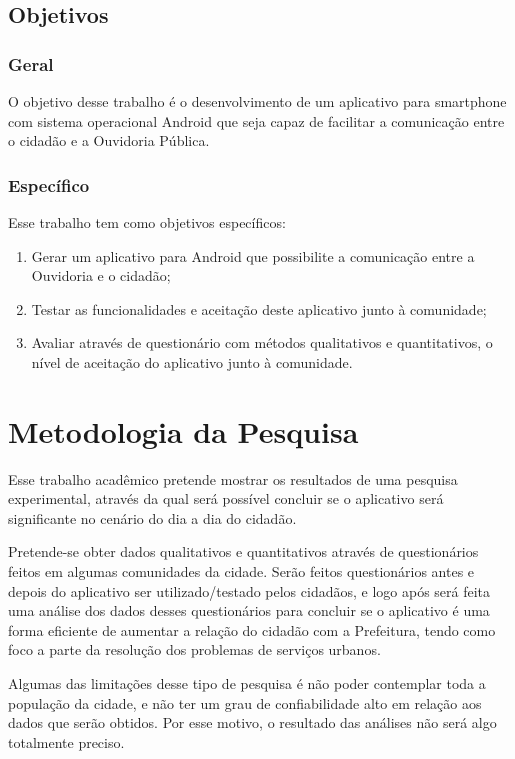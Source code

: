 \documentclass[
	12pt,				%
	openright,			%
	oneside,			%
	a4paper,			%
	english,			%
	french,				%
	spanish,			%
	brazil				%
	]{abntex2}
\begin{document}
\section{Objetivos}

\subsection{Geral}
O objetivo desse trabalho é o desenvolvimento de um aplicativo para smartphone com sistema operacional Android que seja capaz de facilitar a comunicação entre o cidadão e a Ouvidoria Pública.

\subsection{Específico}
Esse trabalho tem como objetivos específicos:
\begin{enumerate}
	\item Gerar um aplicativo para Android que possibilite a comunicação entre a Ouvidoria e o cidadão;
	\item Testar as funcionalidades e aceitação deste aplicativo junto à comunidade;
	\item Avaliar através de questionário com métodos qualitativos e quantitativos, o nível de aceitação do aplicativo junto à comunidade.
\end{enumerate}

\chapter[Metodologia da Pesquisa]{Metodologia da Pesquisa}

Esse trabalho acadêmico pretende mostrar os resultados de uma pesquisa experimental, através da qual será possível concluir se o aplicativo será significante no cenário do dia a  dia do cidadão.

Pretende-se obter dados qualitativos e quantitativos através de questionários feitos em algumas comunidades da cidade. Serão feitos questionários antes e depois do aplicativo ser utilizado/testado pelos cidadãos, e logo após será feita uma análise dos dados desses questionários para concluir se o aplicativo é uma forma eficiente de aumentar a relação do cidadão com a Prefeitura, tendo como foco a parte da resolução dos problemas de serviços urbanos.

Algumas das limitações desse tipo de pesquisa é não poder contemplar toda a população da cidade, e não ter um grau de confiabilidade alto em relação aos dados que serão obtidos. Por esse motivo, o resultado das análises não será algo totalmente preciso.
\end{document}
